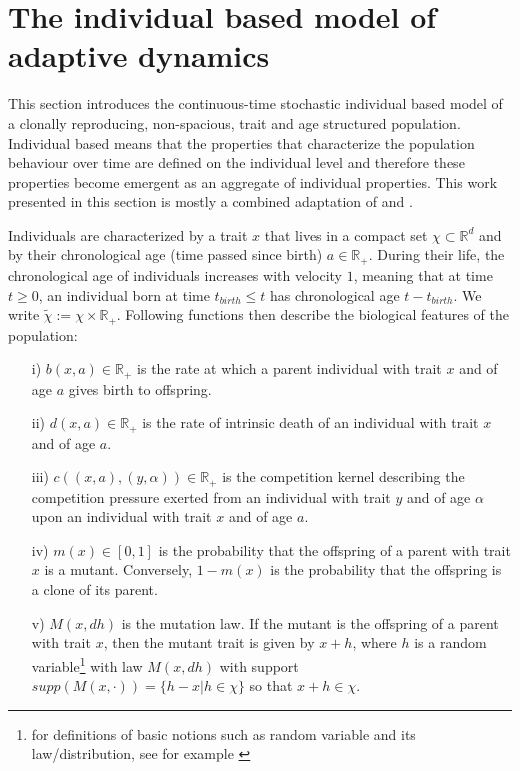 \documentclass[11pt, a4paper]{article}
\theoremstyle{definition}
\begin{document}
\section{The individual based model of adaptive dynamics}
        This section introduces the continuous-time stochastic individual based model of a clonally reproducing, non-spacious, trait and age structured population. Individual based means that the properties that characterize the population behaviour over time are defined on the individual level and therefore these properties become emergent as an aggregate of individual properties.
    This work presented in this section is mostly a combined adaptation of \autocite{bovier2019ad} and \autocite{meleard2009tss}.

    Individuals are characterized by a trait $x$ that lives in a compact set $\chi \subset \mathbb{R}^d$ and by their chronological age (time passed since birth) $a \in \mathbb{R}_+$. During their life, the chronological age of individuals increases with velocity $1$, meaning that at time $t\geq 0$, an individual born at time $t_{birth}\leq t$ has chronological age $t-t_{birth}$. We write $\tilde{\chi} := \chi \times \mathbb{R}_+$. Following functions then describe the biological features of the population:
    \begin{itemize}
        \item[i)] $b(x,a) \in \mathbb{R}_+$ is the rate at which a parent individual with trait $x$ and of age $a$ gives birth to offspring.
        \item[ii)] $d(x,a) \in \mathbb{R}_+$ is the rate of intrinsic death of an individual with trait $x$ and of age $a$.
        \item[iii)] $c((x,a),(y,\alpha)) \in \mathbb{R}_+$ is the competition kernel describing the competition pressure exerted from an individual with trait $y$ and of age $\alpha$ upon an individual with trait $x$ and of age $a$.
        \item[iv)] $m(x) \in [0,1]$ is the probability that the offspring of a parent with trait $x$ is a mutant. Conversely, $1 - m(x)$ is the probability that the offspring is a clone of its parent.
        \item[v)] $M(x,dh)$ is the mutation law. If the mutant is the offspring of a parent with trait $x$, then the mutant trait is given by $x+h$, where $h$ is a random variable\footnote{for definitions of basic notions such as random variable and its law/distribution, see for example \autocite{durrett-prob}} with law $M(x,dh)$ with support $supp(M(x,\cdot))=\{h-x|h\in \chi\}$ so that $x+h \in \chi$.
    \end{itemize}
\end{document}
